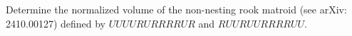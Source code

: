 Determine the normalized volume of the non-nesting rook matroid (see arXiv: 2410.00127) defined by $UUUURURRRRUR$ and $RUURUURRRRUU$.
